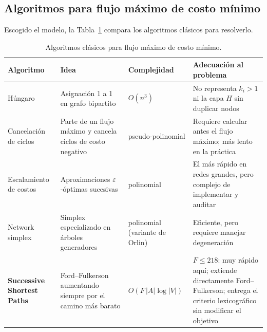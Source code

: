\documentclass{article}
\begin{document}
\subsection{Algoritmos para flujo máximo de costo mínimo}

Escogido el modelo, la Tabla~\ref{tab:algoritmos} compara los algoritmos clásicos para resolverlo.

\begin{table}[H]
\centering
\small
\begin{tabularx}{\textwidth}{>{\raggedright\arraybackslash}p{3.3cm} >{\raggedright\arraybackslash}X >{\raggedright\arraybackslash}p{3.0cm} >{\raggedright\arraybackslash}X}
\toprule
\textbf{Algoritmo} & \textbf{Idea} & \textbf{Complejidad} & \textbf{Adecuación al problema} \\
\midrule
Húngaro~\cite{kuhn1955} & Asignación 1 a 1 en grafo bipartito & $O(n^3)$ & No representa $k_i > 1$ ni la capa $H$ sin duplicar nodos \\
Cancelación de ciclos~\cite{klein1967} & Parte de un flujo máximo y cancela ciclos de costo negativo & pseudo-polinomial & Requiere calcular antes el flujo máximo; más lento en la práctica \\
Escalamiento de costos~\cite{goldberg1990} & Aproximaciones $\varepsilon$-óptimas sucesivas & polinomial & El más rápido en redes grandes, pero complejo de implementar y auditar \\
Network simplex~\cite{orlin1997} & Simplex especializado en árboles generadores & polinomial (variante de Orlin) & Eficiente, pero requiere manejar degeneración \\
\textbf{Successive Shortest Paths}~\cite{busacker1960,tomizawa1971,edmonds1972} & Ford--Fulkerson aumentando siempre por el camino más barato & $O(F\,|A| \log |V|)$ & $F \le 218$: muy rápido aquí; extiende directamente Ford--Fulkerson; entrega el criterio lexicográfico sin modificar el objetivo \\
\bottomrule
\end{tabularx}
\caption{Algoritmos clásicos para flujo máximo de costo mínimo.}
\label{tab:algoritmos}
\end{table}
\end{document}
